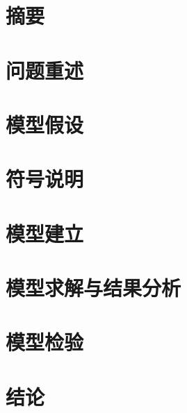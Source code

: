 \documentclass[UTF8,a4paper,12pt]{ctexart}
\begin{document}

\section*{摘要}


\section{问题重述}


\section{模型假设}


\section{符号说明}


\section{模型建立}


\section{模型求解与结果分析}


\section{模型检验}


\section{结论}


\clearpage
\end{document}
